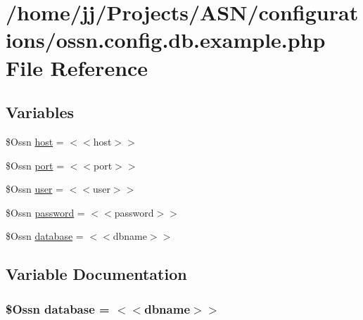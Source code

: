 \hypertarget{ossn_8config_8db_8example_8php}{}\section{/home/jj/\+Projects/\+A\+S\+N/configurations/ossn.config.\+db.\+example.\+php File Reference}
\label{ossn_8config_8db_8example_8php}
\subsection*{Variables}
\begin{DoxyCompactItemize}
\item 
\$Ossn \hyperlink{ossn_8config_8db_8example_8php_a5bc8babfba069f855b3288f34a926b5a}{host} = \textquotesingle{}$<$$<$host$>$$>$\textquotesingle{}
\item 
\$Ossn \hyperlink{ossn_8config_8db_8example_8php_a6e0ca192d866e7f150aa770832456ae2}{port} = \textquotesingle{}$<$$<$port$>$$>$\textquotesingle{}
\item 
\$Ossn \hyperlink{ossn_8config_8db_8example_8php_a802544b7ba9f79bbf24ef67773d53bed}{user} = \textquotesingle{}$<$$<$user$>$$>$\textquotesingle{}
\item 
\$Ossn \hyperlink{ossn_8config_8db_8example_8php_a278da55536f0d7af0d869c0fb5c4e7c3}{password} = \textquotesingle{}$<$$<$password$>$$>$\textquotesingle{}
\item 
\$Ossn \hyperlink{ossn_8config_8db_8example_8php_a4e0ca996705612048240f76ff8d4da95}{database} = \textquotesingle{}$<$$<$dbname$>$$>$\textquotesingle{}
\end{DoxyCompactItemize}


\subsection{Variable Documentation}
\subsubsection[{\texorpdfstring{database}{database}}]{\setlength{\rightskip}{0pt plus 5cm}\$Ossn database = \textquotesingle{}$<$$<$dbname$>$$>$\textquotesingle{}}\hypertarget{ossn_8config_8db_8example_8php_a4e0ca996705612048240f76ff8d4da95}{}\label{ossn_8config_8db_8example_8php_a4e0ca996705612048240f76ff8d4da95}


